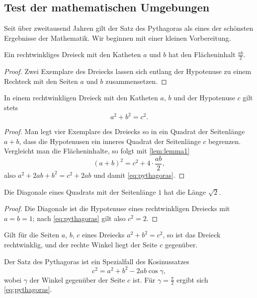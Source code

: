 \subsection{Test der mathematischen Umgebungen}\label{subsec:mumgebungen}
Seit über zweitausend Jahren gilt der Satz des Pythagoras als eines der schönsten Ergebnisse der Mathematik.
Wir beginnen mit einer kleinen Vorbereitung.
%
\begin{lemma}\label{lem:lemma1}
Ein rechtwinkliges Dreieck mit den Katheten $ a $ und $ b $ hat den Flächeninhalt $ \frac{ab}{2} $.
\end{lemma}
%
\begin{proof}
Zwei Exemplare des Dreiecks lassen sich entlang der Hypotenuse zu einem Rechteck mit den Seiten $ a $ und $ b $ zusammensetzen.
\end{proof}
%
\begin{theorem}[Pythagoras]\label{thm:theorem1}
In einem rechtwinkligen Dreieck mit den Katheten $ a $, $ b $ und der Hypotenuse $ c $ gilt stets
\begin{equation}\label{eq:pythagoras}
	a^{ 2 } + b^{ 2 } = c^{ 2 } .
\end{equation}
\end{theorem}
%
\begin{proof}
Man legt vier Exemplare des Dreiecks so in ein Quadrat der Seitenlänge $ a + b $, dass die Hypotenusen ein inneres Quadrat der Seitenlänge $ c $ begrenzen.
Vergleicht man die Flächeninhalte, so folgt mit \cref{lem:lemma1}
%
\[
	(a + b)^{ 2 } = c^{ 2 } + 4 \cdot \frac{ab}{2} ,
\]
%
also $ a^{ 2 } + 2ab + b^{ 2 } = c^{ 2 } + 2ab $ und damit \eqref{eq:pythagoras}.
\end{proof}
\begin{corollary}\label{cor:folgerung}
Die Diagonale eines Quadrats mit der Seitenlänge $ 1 $ hat die Länge $ \sqrt{2} $.
\end{corollary}
%
\begin{proof}
Die Diagonale ist die Hypotenuse eines rechtwinkligen Dreiecks mit $ a = b = 1 $; nach \eqref{eq:pythagoras} gilt also $ c^{ 2 } = 2 $.
\end{proof}
%
\begin{proposition}[Umkehrung]\label{prop:prop}
Gilt für die Seiten $ a $, $ b $, $ c $ eines Dreiecks $ a^{ 2 } + b^{ 2 } = c^{ 2 } $, so ist das Dreieck rechtwinklig, und der rechte Winkel liegt der Seite $ c $ gegenüber.
\end{proposition}
%
\begin{remark}\label{rem:remark}
Der Satz des Pythagoras ist ein Spezialfall des Kosinussatzes
%
\[
	c^{ 2 } = a^{ 2 } + b^{ 2 } - 2ab \cos \gamma ,
\]
%
wobei $ \gamma $ der Winkel gegenüber der Seite $ c $ ist.
Für $ \gamma = \frac{\pi}{2} $ ergibt sich \eqref{eq:pythagoras}.
\end{remark}
